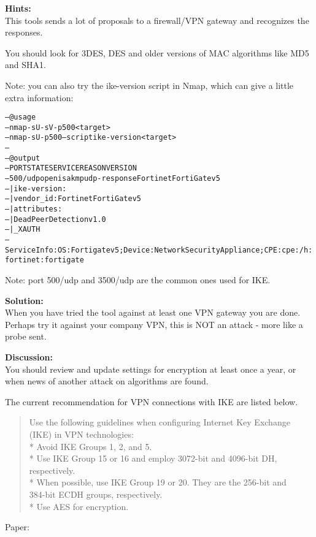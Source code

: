 \documentclass[a4paper,11pt,notitlepage]{report}
\begin{document}
{\bf Hints:}\\
This tools sends a lot of proposals to a firewall/VPN gateway and recognizes the responses.

You should look for 3DES, DES and older versions of MAC algorithms like MD5 and SHA1.

Note: you can also try the ike-version script in Nmap, which can give a little extra information:
\begin{alltt}
-- @usage
-- nmap -sU -sV -p 500 <target>
-- nmap -sU -p 500 --script ike-version <target>
--
-- @output
-- PORT    STATE SERVICE REASON       VERSION
-- 500/udp open  isakmp  udp-response Fortinet FortiGate v5
-- | ike-version:
-- |   vendor_id: Fortinet FortiGate v5
-- |   attributes:
-- |     Dead Peer Detection v1.0
-- |_    XAUTH
-- Service Info: OS: Fortigate v5; Device: Network Security Appliance; CPE: cpe:/h:fortinet:fortigate
\end{alltt}

Note: port 500/udp and 3500/udp are the common ones used for IKE.

{\bf Solution:}\\
When you have tried the tool against at least one VPN gateway you are done. Perhaps try it against your company VPN, this is NOT an attack - more like a probe sent.

{\bf Discussion:}\\
You should review and update settings for encryption at least once a year, or when news of another attack on algorithms are found.

The current recommendation for VPN connections with IKE are listed below.

\begin{quote}
  Use the following guidelines when configuring Internet Key Exchange (IKE) in VPN technologies:\\
* Avoid IKE Groups 1, 2, and 5.\\
* Use IKE Group 15 or 16 and employ 3072-bit and 4096-bit DH, respectively.\\
* When possible, use IKE Group 19 or 20. They are the 256-bit and \\
384-bit ECDH groups, respectively.\\
* Use AES for encryption.
\end{quote}
Paper:\\
{\small {}}
\end{document}
